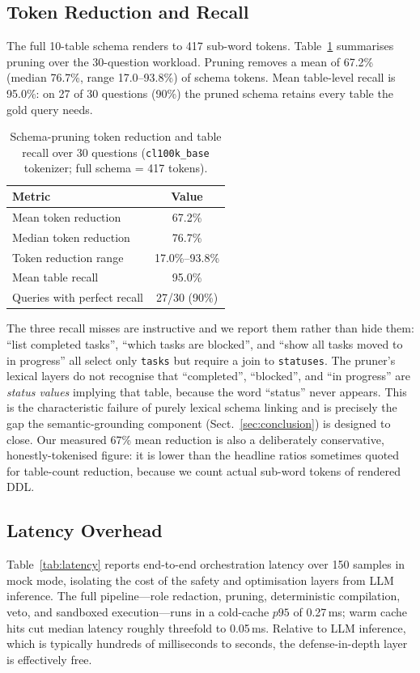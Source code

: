 \documentclass[runningheads]{llncs}
\begin{document}
\subsection{Token Reduction and Recall}
The full 10-table schema renders to 417 sub-word tokens. Table~\ref{tab:tokens} summarises pruning over the 30-question workload. Pruning removes a mean of 67.2\% (median 76.7\%, range 17.0--93.8\%) of schema tokens. Mean table-level recall is 95.0\%: on 27 of 30 questions (90\%) the pruned schema retains every table the gold query needs.

\begin{table}[htbp]
\centering
\caption{Schema-pruning token reduction and table recall over 30 questions (\texttt{cl100k\_base} tokenizer; full schema = 417 tokens).}
\label{tab:tokens}
\begin{tabular}{lc}
\toprule
\textbf{Metric} & \textbf{Value} \\
\midrule
Mean token reduction & 67.2\% \\
Median token reduction & 76.7\% \\
Token reduction range & 17.0\%--93.8\% \\
Mean table recall & 95.0\% \\
Queries with perfect recall & 27/30 (90\%) \\
\bottomrule
\end{tabular}
\end{table}

The three recall misses are instructive and we report them rather than hide them: ``list completed tasks'', ``which tasks are blocked'', and ``show all tasks moved to in progress'' all select only \texttt{tasks} but require a join to \texttt{statuses}. The pruner's lexical layers do not recognise that ``completed'', ``blocked'', and ``in progress'' are \emph{status values} implying that table, because the word ``status'' never appears. This is the characteristic failure of purely lexical schema linking and is precisely the gap the semantic-grounding component (Sect.~\ref{sec:conclusion}) is designed to close. Our measured 67\% mean reduction is also a deliberately conservative, honestly-tokenised figure: it is lower than the headline ratios sometimes quoted for table-count reduction, because we count actual sub-word tokens of rendered DDL.

\subsection{Latency Overhead}
Table~\ref{tab:latency} reports end-to-end orchestration latency over 150 samples in mock mode, isolating the cost of the safety and optimisation layers from LLM inference. The full pipeline---role redaction, pruning, deterministic compilation, veto, and sandboxed execution---runs in a cold-cache $p95$ of 0.27\,ms; warm cache hits cut median latency roughly threefold to 0.05\,ms. Relative to LLM inference, which is typically hundreds of milliseconds to seconds, the defense-in-depth layer is effectively free.
\end{document}
